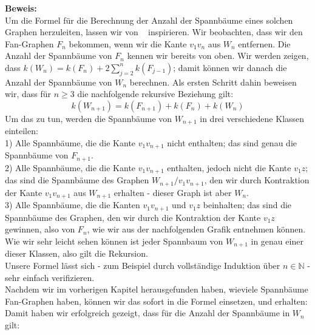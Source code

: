 \textbf{Beweis:}\\
Um die Formel für die Berechnung der Anzahl der Spannbäume eines solchen Graphen herzuleiten, lassen wir von ~\cite{sedlacek_1970} inspirieren.
Wir beobachten, dass wir den Fan-Graphen $F_n$ bekommen, wenn wir die Kante $v_1v_n$ aus $W_n$ entfernen.
Die Anzahl der Spannbäume von $F_n$ kennen wir bereits von oben.
Wir werden zeigen, dass $\mathit{k}(W_n) = \mathit{k}(F_n) + 2 \sum_{j=2}^n\mathit{k}(F_{j-1})$;
damit können wir danach die Anzahl der Spannbäume von $W_n$ berechnen.
Als ersten Schritt dahin beweisen wir, dass für $n \geq 3$ die nachfolgende rekursive Beziehung gilt:
\begin{equation}
 \mathit{k}(W_{n+1}) = \mathit{k}(F_{n+1}) + \mathit{k}(F_n) + \mathit{k}(W_n)
\end{equation}
Um das zu tun, werden die Spannbäume von $W_{n+1}$ in drei verschiedene Klassen einteilen:\\%
1) Alle Spannbäume, die die Kante $v_1v_{n+1}$ nicht enthalten; das sind genau die Spannbäume von $F_{n+1}$.\\
2) Alle Spannbäume, die die Kante $v_1v_{n+1}$ enthalten, jedoch nicht die Kante $v_1z$; das sind die Spannbäume des Graphen $W_{n+1} \slash v_1v_{n+1}$, den wir durch Kontraktion der Kante $v_1v_{n+1}$ aus $W_{n+1}$ erhalten - dieser Graph ist aber $W_n$.\\
3) Alle Spannbäume, die die Kanten $v_1v_{n+1}$ und $v_1z$ beinhalten; das sind die Spannbäume des Graphen, den wir durch die Kontraktion der Kante $v_1z$ gewinnen, also von $F_n$, wie wir aus der nachfolgenden Grafik entnehmen können.\\
Wie wir sehr leicht sehen können ist jeder Spannbaum von $W_{n+1}$ in genau einer dieser Klassen, also gilt die Rekursion.\\
Unsere Formel %
lässt sich - zum Beispiel durch vollständige Induktion über $n \in \mathbb{N}$ - sehr einfach
verifizieren.\\
Nachdem wir im vorherigen Kapitel herausgefunden haben, wieviele Spannbäume Fan-Graphen haben, können wir das sofort in die Formel einsetzen, und erhalten:\\
Damit haben wir erfolgreich gezeigt, dass für die Anzahl der Spannbäume in $W_n$ gilt:\\


